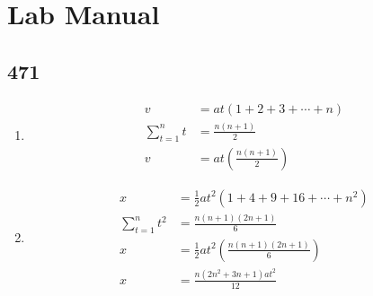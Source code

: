 \documentclass{article}
\begin{document}
\section{Lab Manual}

\subsection{471}
\begin{enumerate}[label=\textbf{(\alph*)}]
	\item
		\begin{align*}
			v & = at(1 + 2 + 3 + \cdots + n) \\
			\sum_{t = 1}^n t & = \frac{n(n + 1)}{2} \\
			v & = at \left( \frac{n(n + 1)}{2} \right)
		\end{align*}
	\item
		\begin{align*}
			x & = \frac{1}{2}at^2(1 + 4 + 9 + 16 + \cdots + n^2) \\
			\sum_{t = 1}^n t^2 & = \frac{n(n + 1)(2n + 1)}{6} \\
			x & = \frac{1}{2}at^2 \left( \frac{n(n + 1)(2n + 1)}{6} \right) \\
			x & = \frac{n(2n^2 + 3n + 1)at^2}{12}
		\end{align*}
\end{enumerate}
\end{document}
